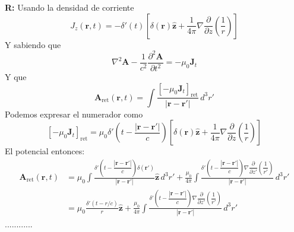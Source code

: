 \documentclass[]{article}
\numberwithin{equation}{section}
\newcommand{\0}{\textcolor{gray}{0}}
\newcommand{\gr}{\nabla}
\newcommand{\la}{\nabla^2}
\newcommand{\rv}{\mathbf{r}}
\newcommand{\zv}{\mathbf{z}}
\newcommand{\zhat}{\hat{\zv}}
\newcommand{\uo}{\mu_{0}}
\newcommand{\rdif}{\rv - \rv'}
\newcommand{\pd}[2]{\dfrac{\partial #1}{\partial #2}}
\newcommand{\n}[1]{\mathbf{#1}}
\begin{document}
\begin{enumerate}
\begin{enumerate}
		\textbf{R:} Usando la densidad de corriente
		\begin{equation*}
			J_{z}(\rv,t) = -\delta'(t)\left[\delta(\rv)\zhat + \frac{1}{4\pi} \gr\pd{}{z}\left(\frac{1}{r}\right)\right]
		\end{equation*}
		Y sabiendo que
		\begin{equation*}
			\la\n{A} - \frac{1}{c^2}\pd{^2\n{A}}{t^2} = -\uo\n{J}_{t}
		\end{equation*}
		Y que
		\begin{equation}
			\n{A}_{\mathrm{ret}}(\rv,t) = \int \frac{\left[-\uo\n{J}_{t}\right]_{\mathrm{ret}}}{|\rdif|}\, d^3 r'
		\end{equation}
		Podemos expresar el numerador como
		\begin{equation*}
			\left[-\uo\n{J}_{t}\right]_{\mathrm{ret}} = \uo \delta'\left(t - \frac{|\rdif|}{c}\right) \left[\delta(\rv)\zhat + \frac{1}{4\pi} \gr\pd{}{z}\left(\frac{1}{r}\right)\right]
		\end{equation*}
		El potencial entonces:
		\begin{align*}
			\n{A}_{\mathrm{ret}}(\rv,t) &= \uo \int \frac{\delta'\left(t - \dfrac{|\rdif|}{c}\right)\delta(\rv')}{|\rdif|}\zhat\, d^3 r' + \frac{\uo}{4\pi} \int \frac{\delta'\left(t - \dfrac{|\rdif|}{c}\right) \gr\pd{}{z'}\left(\dfrac{1}{r'}\right)}{|\rdif|}\, d^3 r'\\
			&= \uo \frac{\delta'\left(t - r/c\right)}{r}\zhat + \frac{\uo}{4\pi} \int \frac{\delta'\left(t - \dfrac{|\rdif|}{c}\right) \gr\pd{}{z'}\left(\dfrac{1}{r'}\right)}{|\rdif|}\, d^3 r'
		\end{align*}
		............
	\end{enumerate}
\end{enumerate}
\end{document}
